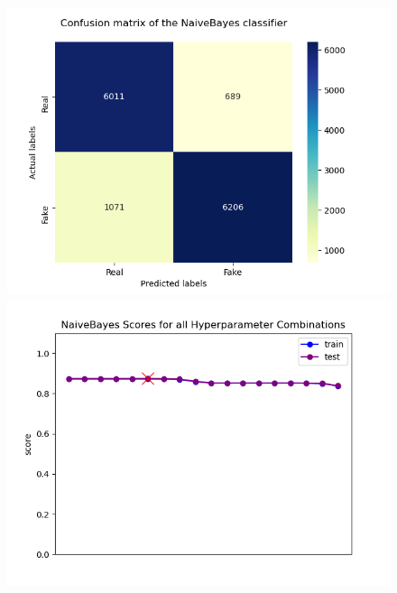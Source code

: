 \documentclass[10pt,twocolumn,letterpaper]{article}
\begin{document}
\begin{figure}[h]
   \begin{center}
        \includegraphics[width=\linewidth]{Latex_Report/report/Graphs/NB/confusion_matrix.png}
        \includegraphics[width=\linewidth]{Latex_Report/report/Graphs/NB/scores_plot.png}
   \end{center}
        \vspace*{-8mm}
        \caption{\label{fourth_figure}}
\end{figure}
\end{document}
